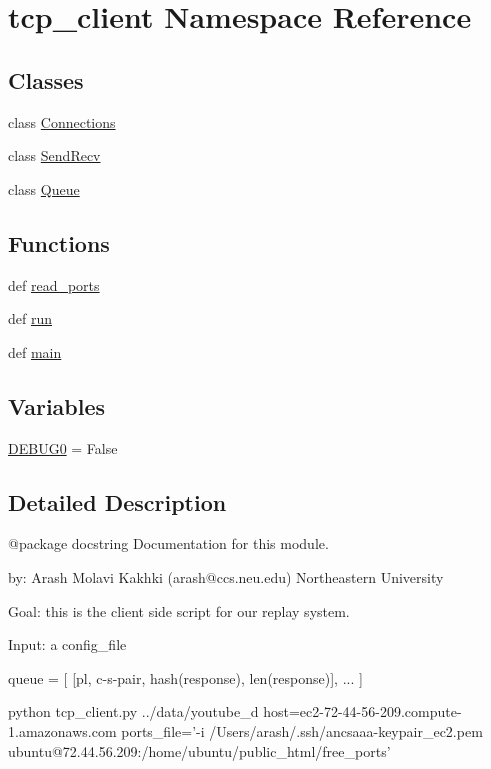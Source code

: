 \hypertarget{namespacetcp__client}{\section{tcp\-\_\-client Namespace Reference}
\label{namespacetcp__client}
}
\subsection*{Classes}
\begin{DoxyCompactItemize}
\item 
class \hyperlink{classtcp__client_1_1_connections}{Connections}
\item 
class \hyperlink{classtcp__client_1_1_send_recv}{Send\-Recv}
\item 
class \hyperlink{classtcp__client_1_1_queue}{Queue}
\end{DoxyCompactItemize}
\subsection*{Functions}
\begin{DoxyCompactItemize}
\item 
def \hyperlink{namespacetcp__client_ab399fb69cbd86776bbd54e12f5bb3310}{read\-\_\-ports}
\item 
def \hyperlink{namespacetcp__client_a619d86369bc1818130dc4bdafe33a122}{run}
\item 
def \hyperlink{namespacetcp__client_aeeaf345aad4737e78cab8295d4b0fc9b}{main}
\end{DoxyCompactItemize}
\subsection*{Variables}
\begin{DoxyCompactItemize}
\item 
\hyperlink{namespacetcp__client_a895ed640f9bf5e6fa45e32d6851fd3ec}{D\-E\-B\-U\-G0} = False
\end{DoxyCompactItemize}


\subsection{Detailed Description}
\begin{DoxyVerb}@package docstring
Documentation for this module.
 
by: Arash Molavi Kakhki (arash@ccs.neu.edu)
Northeastern University

Goal: this is the client side script for our replay system.

Input: a config_file

queue = [ [pl, c-s-pair, hash(response), len(response)], ... ]

python tcp_client.py ../data/youtube_d host=ec2-72-44-56-209.compute-1.amazonaws.com ports_file='-i /Users/arash/.ssh/ancsaaa-keypair_ec2.pem ubuntu@72.44.56.209:/home/ubuntu/public_html/free_ports'\end{DoxyVerb}
 

